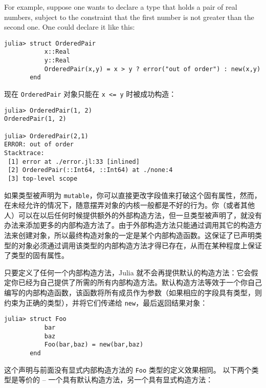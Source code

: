 For example, suppose one wants to declare a type that holds a pair of real numbers, subject to the constraint that the first number is not greater than the second one. One could declare it like this:




\begin{verbatim}
julia> struct OrderedPair
           x::Real
           y::Real
           OrderedPair(x,y) = x > y ? error("out of order") : new(x,y)
       end
\end{verbatim}



现在 \texttt{OrderedPair} 对象只能在 \texttt{x <= y} 时被成功构造：




\begin{verbatim}
julia> OrderedPair(1, 2)
OrderedPair(1, 2)

julia> OrderedPair(2,1)
ERROR: out of order
Stacktrace:
 [1] error at ./error.jl:33 [inlined]
 [2] OrderedPair(::Int64, ::Int64) at ./none:4
 [3] top-level scope
\end{verbatim}



如果类型被声明为 \texttt{mutable}，你可以直接更改字段值来打破这个固有属性，然而，在未经允许的情况下，随意摆弄对象的内核一般都是不好的行为。你（或者其他人）可以在以后任何时候提供额外的外部构造方法，但一旦类型被声明了，就没有办法来添加更多的内部构造方法了。由于外部构造方法只能通过调用其它的构造方法来创建对象，所以最终构造对象的一定是某个内部构造函数。这保证了已声明类型的对象必须通过调用该类型的内部构造方法才得已存在，从而在某种程度上保证了类型的固有属性。



只要定义了任何一个内部构造方法，Julia 就不会再提供默认的构造方法：它会假定你已经为自己提供了所需的所有内部构造方法。默认构造方法等效于一个你自己编写的内部构造函数，该函数将所有成员作为参数（如果相应的字段具有类型，则约束为正确的类型），并将它们传递给 \texttt{new}，最后返回结果对象：




\begin{verbatim}
julia> struct Foo
           bar
           baz
           Foo(bar,baz) = new(bar,baz)
       end

\end{verbatim}



这个声明与前面没有显式内部构造方法的 \texttt{Foo} 类型的定义效果相同。 以下两个类型是等价的 – 一个具有默认构造方法，另一个具有显式构造方法：




